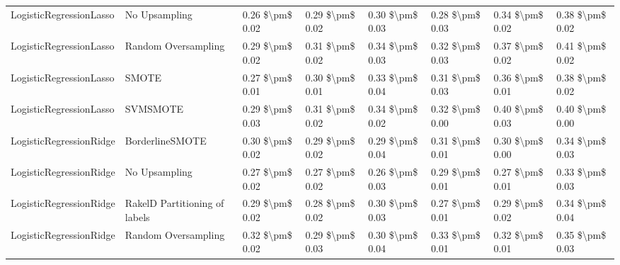 \begin{tabular}{llllllll}
        LogisticRegressionLasso &                 No Upsampling & 0.26 \$\textbackslash pm\$ 0.02 &           0.29 \$\textbackslash pm\$ 0.02 &       0.30 \$\textbackslash pm\$ 0.03 &        0.28 \$\textbackslash pm\$ 0.03 &                         0.34 \$\textbackslash pm\$ 0.02 &     0.38 \$\textbackslash pm\$ 0.02 \\
        LogisticRegressionLasso &           Random Oversampling & 0.29 \$\textbackslash pm\$ 0.02 &           0.31 \$\textbackslash pm\$ 0.02 &       0.34 \$\textbackslash pm\$ 0.03 &        0.32 \$\textbackslash pm\$ 0.03 &                         0.37 \$\textbackslash pm\$ 0.02 &     0.41 \$\textbackslash pm\$ 0.02 \\
        LogisticRegressionLasso &                         SMOTE & 0.27 \$\textbackslash pm\$ 0.01 &           0.30 \$\textbackslash pm\$ 0.01 &       0.33 \$\textbackslash pm\$ 0.04 &        0.31 \$\textbackslash pm\$ 0.03 &                         0.36 \$\textbackslash pm\$ 0.01 &     0.38 \$\textbackslash pm\$ 0.02 \\
        LogisticRegressionLasso &                      SVMSMOTE & 0.29 \$\textbackslash pm\$ 0.03 &           0.31 \$\textbackslash pm\$ 0.02 &       0.34 \$\textbackslash pm\$ 0.02 &        0.32 \$\textbackslash pm\$ 0.00 &                         0.40 \$\textbackslash pm\$ 0.03 &     0.40 \$\textbackslash pm\$ 0.00 \\
        LogisticRegressionRidge &               BorderlineSMOTE & 0.30 \$\textbackslash pm\$ 0.02 &           0.29 \$\textbackslash pm\$ 0.02 &       0.29 \$\textbackslash pm\$ 0.04 &        0.31 \$\textbackslash pm\$ 0.01 &                         0.30 \$\textbackslash pm\$ 0.00 &     0.34 \$\textbackslash pm\$ 0.03 \\
        LogisticRegressionRidge &                 No Upsampling & 0.27 \$\textbackslash pm\$ 0.02 &           0.27 \$\textbackslash pm\$ 0.02 &       0.26 \$\textbackslash pm\$ 0.03 &        0.29 \$\textbackslash pm\$ 0.01 &                         0.27 \$\textbackslash pm\$ 0.01 &     0.33 \$\textbackslash pm\$ 0.03 \\
        LogisticRegressionRidge & RakelD Partitioning of labels & 0.29 \$\textbackslash pm\$ 0.02 &           0.28 \$\textbackslash pm\$ 0.02 &       0.30 \$\textbackslash pm\$ 0.03 &        0.27 \$\textbackslash pm\$ 0.01 &                         0.29 \$\textbackslash pm\$ 0.02 &     0.34 \$\textbackslash pm\$ 0.04 \\
        LogisticRegressionRidge &           Random Oversampling & 0.32 \$\textbackslash pm\$ 0.02 &           0.29 \$\textbackslash pm\$ 0.03 &       0.30 \$\textbackslash pm\$ 0.04 &        0.33 \$\textbackslash pm\$ 0.01 &                         0.32 \$\textbackslash pm\$ 0.01 &     0.35 \$\textbackslash pm\$ 0.03 \\

\end{tabular}

